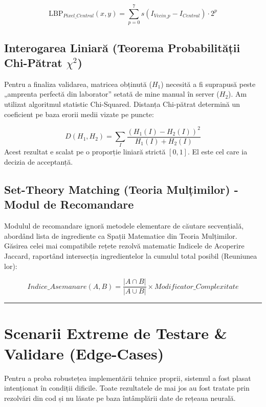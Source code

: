 \documentclass[12pt,a4paper]{article}
\begin{document}
\[
\text{LBP}_{Pixel\_Central}(x,y) = \sum_{p=0}^{7} s(I_{Vecin\_p} - I_{Central}) \cdot 2^p
\]

\subsection{Interogarea Liniară (Teorema Probabilității Chi-Pătrat $\chi^2$)}
Pentru a finaliza validarea, matricea obținută ($H_1$) necesită a fi suprapusă peste „amprenta perfectă din laborator” setată de mine manual în server ($H_2$). Am utilizat algoritmul statistic Chi-Squared. Distanța Chi-pătrat determină un coeficient pe baza erorii medii vizate pe puncte:

\[
D(H_1, H_2) = \sum_{I} \frac{(H_1(I) - H_2(I))^2}{H_1(I) + H_2(I)}
\]
Acest rezultat e scalat pe o proporție liniară strictă $[0, 1]$. El este cel care ia decizia de acceptanță.

\subsection{Set-Theory Matching (Teoria Mulțimilor) - Modul de Recomandare}
Modulul de recomandare ignoră metodele elementare de căutare secvențială, abordând lista de ingrediente ca Spații Matematice din Teoria Mulțimilor. Găsirea celei mai compatibile rețete rezolvă matematic Indicele de Acoperire Jaccard, raportând intersecția ingredientelor la cumulul total posibil (Reuniunea lor):

\[
Indice\_Asemanare(A,B) = \frac{| A \cap B |}{| A \cup B |} \times Modificator\_Complexitate
\]

\vspace{0.5cm}
\hrule
\vspace{0.5cm}

\section{Scenarii Extreme de Testare \& Validare (Edge-Cases)}

Pentru a proba robustețea implementării tehnice proprii, sistemul a fost plasat intenționat în condiții dificile. Toate rezultatele de mai jos au fost tratate prin rezolvări din cod și nu lăsate pe baza întâmplării date de rețeaua neurală.
\end{document}

